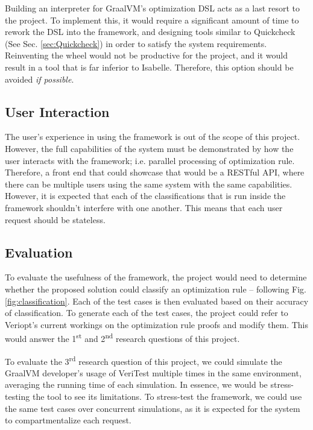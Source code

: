Building an interpreter for GraalVM's optimization DSL acts as a last resort to the project. To implement this, it would require a significant 
amount of time to rework the DSL into the framework, and designing tools similar to Quickcheck (See Sec. \ref{sec:Quickcheck}) in order to satisfy the 
system requirements. Reinventing the wheel would not be productive for the project, and it would result in a tool that is far inferior to Isabelle.
Therefore, this option should be avoided \emph{if possible}.

\subsection{User Interaction}

The user's experience in using the framework is out of the scope of this project. However, the full capabilities of the system must be demonstrated 
by how the user interacts with the framework; i.e. parallel processing of optimization rule. Therefore, a front end that could showcase that would 
be a RESTful API, where there can be multiple users using the same system with the same capabilities. However, it is expected that each of the 
classifications that is run inside the framework shouldn't interfere with one another. This means that each user request should be stateless.

\subsection{Evaluation}
\label{sec:Evaluation}

To evaluate the usefulness of the framework, the project would need to determine whether the proposed solution could classify an optimization rule -- 
following Fig. \ref{fig:classification}. Each of the test cases is then evaluated based on their accuracy of classification. To generate each of the 
test cases, the project could refer to Veriopt's current workings on the optimization rule proofs and modify them. This would answer the 
1\textsuperscript{st} and 2\textsuperscript{nd} research questions of this project.

To evaluate the 3\textsuperscript{rd} research question of this project, we could simulate the GraalVM developer's usage of VeriTest multiple times in 
the same environment, averaging the running time of each simulation. In essence, we would be stress-testing the tool to see its limitations.
To stress-test the framework, we could use the same test cases over concurrent simulations, as it is expected for the system to compartmentalize 
each request.